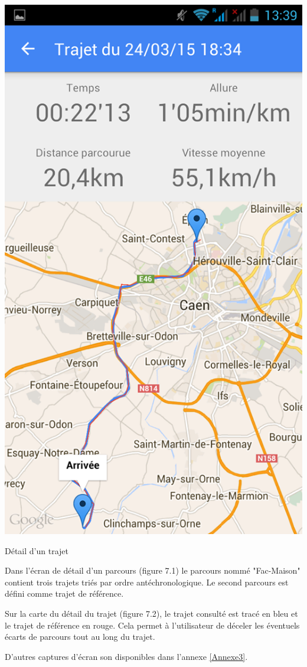 \begin{multicols}{2}
\begin{img}
  \includegraphics[scale=0.35]{img/trajet.jpg}
  \caption{Détail d'un trajet}
\end{img}
\end{multicols}

Dans l'écran de détail d'un parcours (figure 7.1) le parcours nommé "Fac-Maison" contient trois trajets triés par ordre antéchronologique. Le second parcours est défini comme trajet de référence.\bigskip

Sur la carte du détail du trajet (figure 7.2), le trajet consulté est tracé en bleu et le trajet de référence en rouge. Cela permet à l'utilisateur de déceler les éventuels écarts de parcours tout au long du trajet.\bigskip

D'autres captures d'écran son disponibles dans l'annexe \ref{Annexe3}.